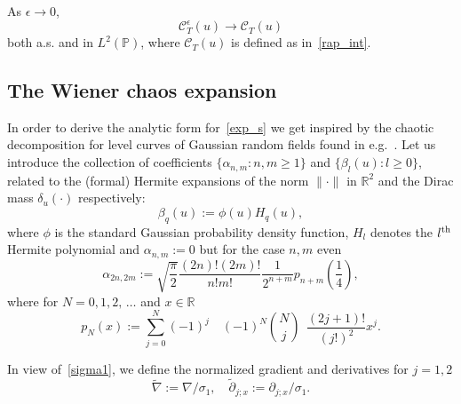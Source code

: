 \documentclass[AHL,Unicode,longabstracts,published]{cedram}
\newcommand{\clC}{\mathcal{C}}
\newcommand{\bbR}{\mathbb{R}}
\newcommand{\bbP}{\mathbb{P}}
\begin{document}
\begin{lemm}\label{approx}
As $\epsilon\to 0$,
\begin{equation}
\clC_T^\epsilon(u) \to \clC_T(u)
\end{equation}
both a.s. and in $L^2(\bbP)$, where $\clC_T(u)$ is defined as in~\eqref{rap_int}.
\end{lemm}

\subsection{The Wiener chaos expansion}
\label{sec-Wiener}

In order to derive the analytic form for~\eqref{exp_s} we get inspired by the chaotic decomposition for level curves of Gaussian random fields found in e.g.~\cite{KL01, MPRW16}. Let us introduce the collection of coefficients $\{\alpha_{n,m} : n,m\geq 1\}$ and $\{\beta_{l}(u) : l\geq 0\}$, related to the (formal) Hermite expansions of the norm $\| \cdot \|$ in $\bbR^2$ and the Dirac mass $\delta_u(\cdot)$ respectively:
\begin{equation}\label{e:beta}
\beta_{q}(u):= \phi(u)H_{q}(u),
\end{equation}
where $\phi$ is the standard Gaussian probability density function, $H_{l}$ denotes the $l^{\rm th}$ Hermite polynomial and $\alpha_{n,m}:=0$ but for the case $n,m$ even
\begin{equation}\label{e:alpha}
\alpha_{2n,2m}:=\sqrt{\frac{\pi}{2}}\frac{(2n)!(2m)!}{n! m!}\frac{1}{2^{n+m}} p_{n+m}\left(\frac14\right),
\end{equation}
where for $N=0, 1, 2,\,\dots$ and $x\in \bbR$
\begin{equation}\label{pN}
p_{N}(x) :=\sum_{j=0}^{N}(-1)^{j}\quad (-1)^{N}{\binom{N}{j}}\ \ \frac{(2j+1)!}{(j!)^2} x^j.
\end{equation}

In view of~\eqref{sigma1}, we define the normalized gradient and derivatives for $j=1,2$
\begin{equation*}
\widetilde \nabla := \nabla /\sigma_1,\quad \widetilde \partial_{j;x} :=
\partial_{j;x}/\sigma_1.
\end{equation*}
\end{document}
